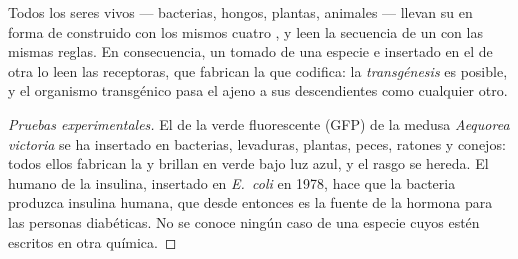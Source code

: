\begin{proposition}\label{prop:g10:universal-dna:universal}
Todos los seres vivos --- bacterias, hongos, plantas, animales ---
llevan su  en forma de  construido con los
mismos cuatro , y leen la secuencia de un  con las mismas
reglas. En consecuencia, un  tomado de una especie e insertado en el
 de otra lo leen las  receptoras, que fabrican la 
que codifica: la \emph{transgénesis} es posible, y
el organismo transgénico pasa el  ajeno a sus descendientes como
cualquier otro.
\end{proposition}
\begin{proof}[Pruebas experimentales]
El  de la  verde fluorescente (GFP) de la medusa
\emph{Aequorea victoria} se ha insertado en bacterias, levaduras,
plantas, peces, ratones y conejos: todos ellos fabrican la  y
brillan en verde bajo luz azul, y el rasgo se hereda. El  humano de
la insulina, insertado en \emph{E.~coli} en 1978, hace que la bacteria
produzca insulina humana, que desde entonces es la fuente de la hormona
para las personas diabéticas. No se conoce ningún caso de una especie
cuyos  estén escritos en otra química.
\end{proof}

